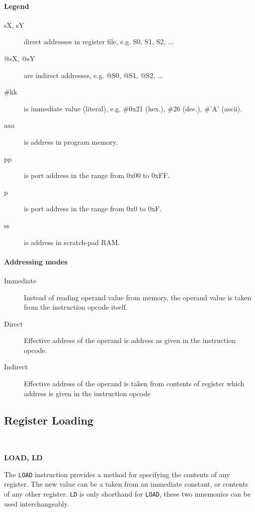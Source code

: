 \newcommand{\no}{\color{red}{\textbf{no}}}
\newcommand{\yes}{\color{black}{\textbf{yes}}}

\newcommand{\instruction}[1]{~\\[7pt]\addcontentsline{toc}{subsubsection}{#1}\colorbox{instruction_bg}{\parbox{\dimexpr\textwidth-2\fboxsep}{\color{black}\textbf{#1}}}\bigskip}

\paragraph{Legend}
    \begin{description}
        \item[sX, sY]
            direct addresses in register file, e.g. S0, S1, S2, ...
        \item[@sX, @sY]
            are indirect addresses, e.g. @S0, @S1, @S2, ...
        \item[\#kk]
            is immediate value (literal), e.g. \#0x21 (hex.), \#26 (dec.), \#'A' (ascii).
        \item[aaa]
            is address in program memory.
        \item[pp]
            is port address in the range from 0x00 to 0xFF.
        \item[p]
            is port address in the range from 0x0 to 0xF.
        \item[ss]
            is address in scratch-pad RAM.
    \end{description}

\paragraph{Addressing modes}
    \begin{description}
        \item[Immediate]
            Instead of reading operand value from memory, the operand value is taken from the instruction opcode itself.
        \item[Direct]
            Effective address of the operand is address as given in the instruction opcode.
        \item[Indirect]
            Effective address of the operand is taken from contents of register which address is given in the instruction opcode
    \end{description}

\subsection{Register Loading}
    \instruction{LOAD, LD}
        The \texttt{LOAD} instruction provides a method for specifying the contents of any register. The new value can be a taken from an immediate constant, or contents of any other register. \texttt{LD} is only shorthand for \texttt{LOAD}, these two mnemonics can be used interchangeably.

